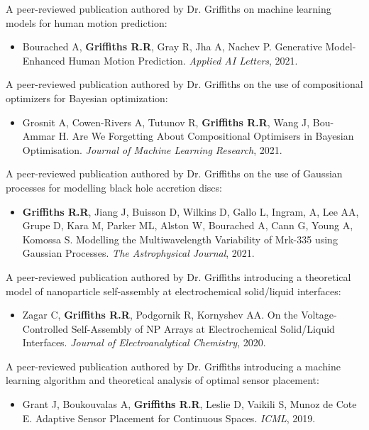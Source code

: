 \documentclass[11pt]{article}
\begin{document}
\begin{thebibliography}{9}
A peer-reviewed publication authored by Dr. Griffiths on machine learning models for human motion prediction:
\begin{itemize}
\item Bourached A, \textbf{Griffiths R.R}, Gray R, Jha A, Nachev P. Generative Model-Enhanced Human Motion Prediction. \textit{Applied AI Letters}, 2021.
\end{itemize}

A peer-reviewed publication authored by Dr. Griffiths on the use of compositional optimizers for Bayesian optimization:
\begin{itemize}
\item Grosnit A, Cowen-Rivers A, Tutunov R, \textbf{Griffiths R.R}, Wang J, Bou-Ammar H. Are We Forgetting About Compositional Optimisers in Bayesian Optimisation. \textit{Journal of Machine Learning Research}, 2021.
\end{itemize}

A peer-reviewed publication authored by Dr. Griffiths on the use of Gaussian processes for modelling black hole accretion discs:
\begin{itemize}
\item \textbf{Griffiths R.R}, Jiang J, Buisson D, Wilkins D, Gallo L, Ingram, A, Lee AA, Grupe D, Kara M, Parker ML, Alston W, Bourached A, Cann G, Young A, Komossa S. Modelling the Multiwavelength Variability of Mrk-335 using Gaussian Processes. \textit{The Astrophysical Journal}, 2021.
\end{itemize}

A peer-reviewed publication authored by Dr. Griffiths introducing a theoretical model of nanoparticle self-assembly at electrochemical solid/liquid interfaces:
\begin{itemize}
\item Zagar C, \textbf{Griffiths R.R}, Podgornik R, Kornyshev AA. On the Voltage-Controlled Self-Assembly of NP Arrays at Electrochemical Solid/Liquid Interfaces. \textit{Journal of Electroanalytical Chemistry}, 2020.
\end{itemize}

A peer-reviewed publication authored by Dr. Griffiths introducing a machine learning algorithm and theoretical analysis of optimal sensor placement:
\begin{itemize}
\item Grant J, Boukouvalas A, \textbf{Griffiths R.R}, Leslie D, Vaikili S, Munoz de Cote E. Adaptive Sensor Placement for Continuous Spaces. \textit{ICML}, 2019.
\end{itemize}


\end{thebibliography}
\end{document}
